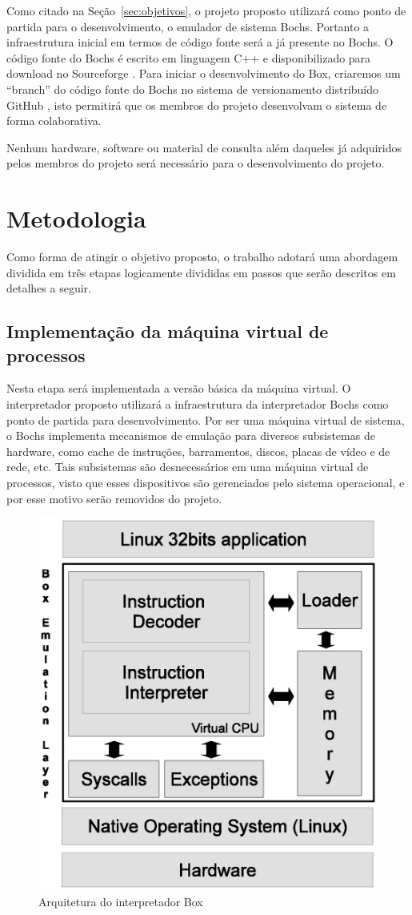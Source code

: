 \documentclass[11pt,twoside]{article}
\begin{document}
Como citado na Seção~\ref{sec:objetivos}, o projeto proposto utilizará como
ponto de partida para o desenvolvimento, o emulador de sistema Bochs. Portanto 
a infraestrutura inicial em termos de código fonte será a já presente no Bochs. 
O código fonte do Bochs é escrito em linguagem C++ e disponibilizado para download
no Sourceforge \cite{bochs_site}. Para iniciar o desenvolvimento do Box, criaremos
um ``branch'' do código fonte do Bochs no sistema de versionamento distribuído
GitHub \cite{github}, isto permitirá que os membros do projeto desenvolvam o sistema
de forma colaborativa.

Nenhum hardware, software ou material de consulta além daqueles já adquiridos 
pelos membros do projeto será necessário para o desenvolvimento do projeto.





\section{Metodologia}  \label{sec:metodologia}

Como forma de atingir o objetivo proposto, o trabalho adotará uma abordagem dividida em três etapas logicamente divididas em passos que serão descritos em detalhes a seguir.

\subsection{Implementação da máquina virtual de processos}

Nesta etapa será implementada a versão básica da máquina virtual.
O interpretador proposto utilizará a infraestrutura da interpretador Bochs como ponto de partida para desenvolvimento. 
Por ser uma máquina virtual de sistema, o Bochs implementa mecanismos de emulação para diversos subsistemas de hardware, como cache de instruções, barramentos, discos, placas de vídeo e de rede, etc.
Tais subsistemas são desnecessários em uma máquina virtual de processos, visto que esses dispositivos são gerenciados pelo sistema operacional, e por esse motivo serão removidos do projeto.

\begin{figure}[h]
 \centering
 \includegraphics[width=0.5\columnwidth]{./figures/box-architecture.eps}
 \caption{Arquitetura do interpretador Box}
 \label{fig:box-architecture}
\end{figure}
\end{document}
